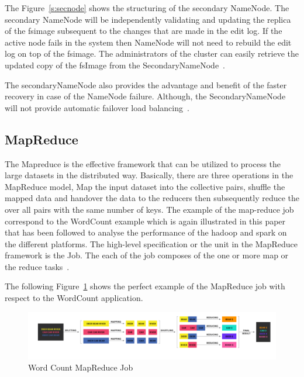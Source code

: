 The Figure~\ref{s:secnode} shows the structuring of the secondary NameNode. 
The secondary NameNode will be independently validating and 
updating the replica of the fsimage subsequent to the changes 
that are made in the edit log. If the active node fails in the 
system then NameNode will not need to rebuild the edit 
log on top of the fsimage. The administrators of the 
cluster can easily retrieve the updated copy of the 
fsImage from the 
SecondaryNameNode~\cite{hid-sp18-412-hadoop-architecture-overview}.

The secondaryNameNode also provides the advantage and 
benefit of the faster recovery in case of the NameNode failure. 
Although, the SecondaryNameNode 
will not provide automatic failover 
load balancing~\cite{hid-sp18-412-hadoop-architecture-overview}.


\subsection{MapReduce}
The Mapreduce is the effective framework that can be 
utilized to process the large datasets in the distributed way. 
Basically, there are three operations in the MapReduce model, 
Map the input dataset into the collective pairs, 
shuffle the mapped data and handover the data to the 
reducers then subsequently reduce the over all pairs 
with the same number of keys. The example of the 
map-reduce job correspond to the WordCount example 
which is again illustrated in this paper that has 
been followed to analyse the performance of the hadoop 
and spark on the different platforms. 
The high-level specification or the unit in the 
MapReduce framework is the Job. The each of the 
job composes of the one or 
more map or the reduce tasks~\cite{hid-sp18-412-hadoop-architecture-overview}. 

The following Figure~\ref{s:mapreduce} 
shows the perfect example of the 
MapReduce job with respect to the WordCount application.

\begin{figure}[!ht]
\centering\includegraphics[width=\textwidth]{images/WordCountMapReduce.png}
\caption{Word Count 
MapReduce 
Job~\cite{hid-sp18-412-hadoop-architecture-overview}}\label{s:mapreduce}
\end{figure}

